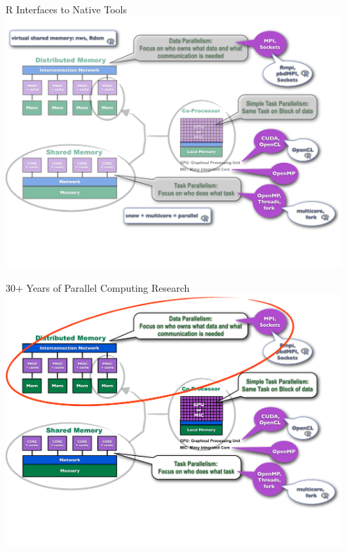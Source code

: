 \begin{frame}
\begin{block}{R Interfaces to Native Tools}
    \includegraphics[width=0.95\textwidth]{pics/ParallelHardware7.pdf}
\end{block}
\end{frame}

\begin{frame}
\begin{block}{30+ Years of Parallel Computing Research}
    \includegraphics[width=0.95\textwidth]{pics/ParallelHardware8.pdf}
\end{block}
\end{frame}

